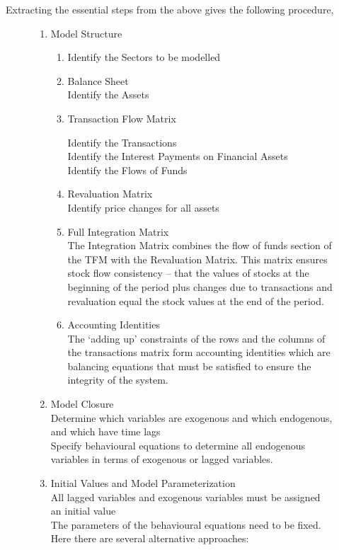 \documentclass[twoside,a4paper,11pt]{article}
\begin{document}
Extracting the essential steps from the above gives the following procedure,\\
\begin{figure}[h!]
\begin{enumerate}
\item{Model Structure}
 \begin{enumerate}
 \item{Identify the Sectors to be modelled}
 \item{Balance Sheet}\\
         Identify the Assets
 \item{Transaction Flow Matrix}
	 \begin{enumerate}
         Identify the Transactions\\
         Identify the Interest Payments on Financial Assets\\
         Identify the Flows of Funds
 	\end{enumerate}
 \item{Revaluation Matrix}\\
         Identify price changes for all assets
 \item{Full Integration Matrix}\\
         The Integration Matrix combines the flow of funds section of the TFM with the Revaluation Matrix. This             matrix ensures stock flow consistency -- that the values of stocks at the beginning of the period plus changes due to transactions and revaluation equal the stock values at the end of the period.
 \item{Accounting Identities}\\
         The `adding up' constraints of the rows and the columns of the transactions matrix form accounting identities which are balancing equations that must be satisfied to ensure the integrity of the system.
 \end{enumerate}
\item{Model Closure}\\
         Determine which variables are exogenous and which endogenous, and which have time lags\\
         Specify behavioural equations to determine all endogenous variables in terms of exogenous or lagged variables.
\item{Initial Values and Model Parameterization}\\
         All lagged variables and exogenous variables must be assigned an initial value\\
         The parameters of the behavioural equations need to be fixed. Here there are several alternative approaches:

\end{enumerate}
\end{figure}
\end{document}
